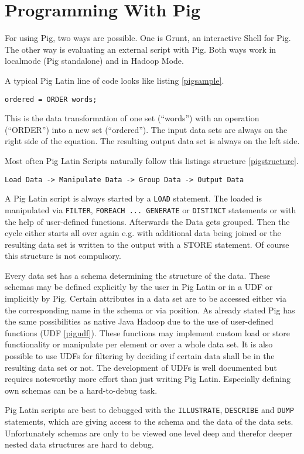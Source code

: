 \section{Programming With Pig}

For using Pig, two ways are possible. One is Grunt, an interactive Shell for Pig. The other way is evaluating an external script with Pig. Both ways work in localmode (Pig standalone) and in Hadoop Mode.
                              
A typical Pig Latin line of code looks like listing \ref{pigsample}.

\begin{lstlisting}[language=pig,caption=A typical Pig line of code,label=pigsample]
ordered = ORDER words;
\end{lstlisting}

This is the data transformation of one set (``words'') with an operation (``ORDER'') into a new set (``ordered''). The input data sets are always on the right side of the equation. The resulting output data set is always on the left side.

Most often Pig Latin Scripts naturally follow this listings structure \ref{pigstructure}.

\begin{lstlisting}[language=pig,caption=Pig Latin Script Structure ,label=pigstructure]
Load Data -> Manipulate Data -> Group Data -> Output Data
\end{lstlisting}
                                                       
A Pig Latin script is always started by a {\tt LOAD} statement. The loaded is manipulated via {\tt FILTER}, {\tt FOREACH ... GENERATE} or {\tt DISTINCT} statements or with the help of user-defined functions. Afterwards the Data gets grouped. Then the cycle either starts all over again e.g. with additional data being joined or the resulting data set is written to the output with a STORE statement. Of course this structure is not compulsory.
                   
Every data set has a schema determining the structure of the data. These schemas may be defined explicitly by the user in Pig Latin or in a UDF or implicitly by Pig. Certain attributes in a data set are to be accessed either via the corresponding name in the schema or via position.
As already stated Pig has the same possibilities as native Java Hadoop due to the use of user-defined functions (UDF \ref{pigudf}). These functions may implement custom load or store functionality or manipulate per element or over a whole data set. It is also possible to use UDFs for filtering by deciding if certain data shall be in the resulting data set or not.
The development of UDFs is well documented but requires noteworthy more effort than just writing Pig Latin. Especially defining own schemas can be a hard-to-debug task. 

Pig Latin scripts are best to debugged with the {\tt ILLUSTRATE}, {\tt DESCRIBE} and {\tt DUMP} statements, which are giving access to the schema and the data of the data sets. Unfortunately schemas are only to be viewed one level deep and therefor deeper nested data structures are hard to debug.